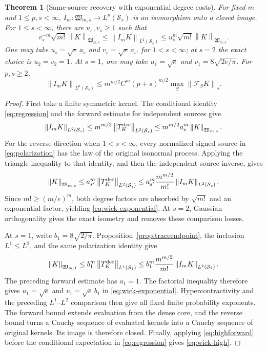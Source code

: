\documentclass[11pt,a4paper]{amsart}
\numberwithin{equation}{section}
\newtheorem{theorem}{Theorem}[section]
\theoremstyle{definition}
\theoremstyle{remark}
\newcommand{\Sch}{\mathcal S}
\newcommand{\Wc}{\mathfrak W}
\newcommand{\Flat}{\mathcal F}
\newcommand{\norm}[1]{\left\lVert#1\right\rVert}
\begin{document}
\begin{theorem}[Same-source recovery with exponential degree costs]\label{thm:wickrecover}
For fixed $m$ and $1\le p,s<\infty$, $I_m:\Wc_{m,s}\to L^p(\Sch_s)$ is an isomorphism onto a closed image. For $1\le s<\infty$, there are $u_s,v_s\ge1$ such that
\begin{equation}\label{eq:wick-exponential}
 v_s^{-m}\sqrt{m!}\norm K_{\Wc_{m,s}}
 \le\norm{I_mK}_{L^2(\Sch_s)}
 \le u_s^m\sqrt{m!}\norm K_{\Wc_{m,s}}.
\end{equation}
One may take $u_s=\sqrt e\,a_s$ and $v_s=\sqrt e\,a_{s'}$ for $1<s<\infty$; at $s=2$ the exact choice is $u_2=v_2=1$. At $s=1$, one may take $u_1=\sqrt e$ and $v_1=8\sqrt{2e/\pi}$. For $p,s\ge2$,
\begin{equation}\label{eq:wick-high}
 \norm{I_mK}_{L^p(\Sch_s)}
 \le m^{m/2}C^m(p+s)^{m/2}\max_S\norm{\Flat_SK}_s.
\end{equation}
\end{theorem}
\begin{proof}
First take a finite symmetric kernel. The conditional identity \eqref{eq:regression} and the forward estimate for independent sources give
\[
 \norm{I_mK}_{L^2(\Sch_s)}
 \le m^{m/2}\norm{T_K^{\rm dec}}_{L^2(\Sch_s)}
 \le m^{m/2}a_s^m\norm K_{\Wc_{m,s}}.
\]
For the reverse direction when $1<s<\infty$, every normalized signed source in \eqref{eq:polarization} has the law of the original isonormal process. Applying the triangle inequality to that identity, and then the independent-source inverse, gives
\[
 \norm K_{\Wc_{m,s}}
 \le a_{s'}^m\norm{T_K^{\rm dec}}_{L^2(\Sch_s)}
 \le a_{s'}^m\frac{m^{m/2}}{m!}
                    \norm{I_mK}_{L^2(\Sch_s)}.
\]
Since $m!\ge(m/e)^m$, both degree factors are absorbed by $\sqrt{m!}$ and an exponential factor, yielding \eqref{eq:wick-exponential}. At $s=2$, Gaussian orthogonality gives the exact isometry and removes these comparison losses.

At $s=1$, write $b_1=8\sqrt{2/\pi}$. Proposition~\ref{prop:traceendpoint}, the inclusion $L^1\le L^2$, and the same polarization identity give
\[
 \norm K_{\Wc_{m,1}}
 \le b_1^m\norm{T_K^{\rm dec}}_{L^1(\Sch_1)}
 \le b_1^m\frac{m^{m/2}}{m!}\norm{I_mK}_{L^2(\Sch_1)}.
\]
The preceding forward estimate has $a_1=1$. The factorial inequality therefore gives $u_1=\sqrt e$ and $v_1=\sqrt e\,b_1$ in \eqref{eq:wick-exponential}. Hypercontractivity and the preceding $L^1$--$L^2$ comparison then give all fixed finite probability exponents. The forward bound extends evaluation from the dense core, and the reverse bound turns a Cauchy sequence of evaluated kernels into a Cauchy sequence of original kernels. Its image is therefore closed. Finally, applying \eqref{eq:highforward} before the conditional expectation in \eqref{eq:regression} gives \eqref{eq:wick-high}.
\end{proof}
\end{document}
